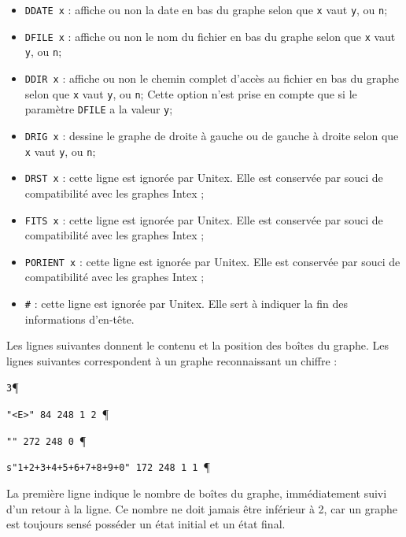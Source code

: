 \begin{itemize}
  \item \verb+DDATE x+ : affiche ou non la date en bas du graphe selon que \verb+x+ vaut
  	  \verb+y+, ou \verb+n+;

  \item \verb+DFILE x+ : affiche ou non le nom du fichier en bas du graphe selon que \verb+x+ vaut
  	  \verb+y+, ou \verb+n+;

  \item \verb+DDIR x+ : affiche ou non le chemin complet d’accès au fichier en bas du graphe selon
  	  que \verb+x+ vaut \verb+y+, ou \verb+n+; Cette option n’est prise en compte que si le
  	  paramètre \verb+DFILE+ a la valeur \verb+y+;

  \item \verb+DRIG x+ : dessine le graphe de droite à gauche ou de gauche à droite selon que
  	  \verb+x+ vaut \verb+y+, ou \verb+n+;

  \item \verb+DRST x+ : cette ligne est ignorée par Unitex. Elle est conservée par souci de
  	  compatibilité avec les graphes Intex ;

  \item \verb+FITS x+ : cette ligne est ignorée par Unitex. Elle est conservée par souci de
  	  compatibilité avec les graphes Intex ;

  \item \verb+PORIENT x+ : cette ligne est ignorée par Unitex. Elle est conservée par souci de
  	  compatibilité avec les graphes Intex ;

  \item \verb+#+ : cette ligne est ignorée par Unitex. Elle sert à indiquer la fin des informations
  	  d’en-tête.

\end{itemize}

\bigskip
\noindent  Les lignes suivantes donnent le contenu et la position des boîtes du graphe. Les lignes
suivantes correspondent à un graphe reconnaissant un chiffre :


\bigskip
\verb+3+\P

\verb+"<E>" 84 248 1 2 +\P

\verb+"" 272 248 0 +\P

\verb$s"1+2+3+4+5+6+7+8+9+0" 172 248 1 1 $\P

\bigskip
\noindent La première ligne indique le nombre de boîtes du graphe, immédiatement suivi d’un
retour à la ligne. Ce nombre ne doit jamais être inférieur à 2, car un graphe est toujours
sensé posséder un état initial et un état final.


